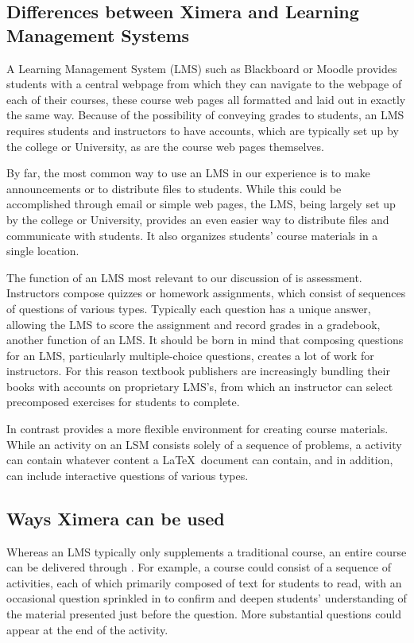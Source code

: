 \documentclass{ximera}
\begin{document}
\subsection{Differences between Ximera and Learning Management Systems}
A Learning Management System (LMS) such as Blackboard or Moodle
provides students with a central webpage from which they can navigate
to the webpage of each of their courses, these course web pages all
formatted and laid out in exactly the same way.  Because of the
possibility of conveying grades to students, an LMS requires students
and instructors to have accounts, which are typically set up by the
college or University, as are the course web pages themselves.

By far, the most common way to use an LMS in our experience is to make
announcements or to distribute files to students.  While this could be
accomplished through email or simple web pages, the LMS, being largely
set up by the college or University, provides an even easier way to
distribute files and communicate with students.  It also organizes
students' course materials in a single location.

The function of an LMS most relevant to our discussion of
 is assessment.  Instructors
compose quizzes or homework assignments, which consist of sequences of
questions of various types.  Typically each question has a unique
answer, allowing the LMS to score the assignment and record grades in
a gradebook, another function of an LMS.  It should be born in mind
that composing questions for an LMS, particularly multiple-choice
questions, creates a lot of work for instructors. For this reason
textbook publishers are increasingly bundling their books with
accounts on proprietary LMS's, from which an instructor can select
precomposed exercises for students to complete.

In contrast  provides a more
flexible environment for creating course materials.  While an activity
on an LSM consists solely of a sequence of problems, a
 activity can contain whatever
content a \LaTeX\ document can contain, and in addition, can include
interactive questions of various types.

\subsection{Ways Ximera can be used}
Whereas an LMS typically only supplements a traditional course, an
entire course can be delivered through
.  For example, a course could
consist of a sequence of 
activities, each of which primarily composed of text for students to
read, with an occasional question sprinkled in to confirm and deepen
students' understanding of the material presented just before the
question.  More substantial questions could appear at the end of the
activity.
\end{document}
